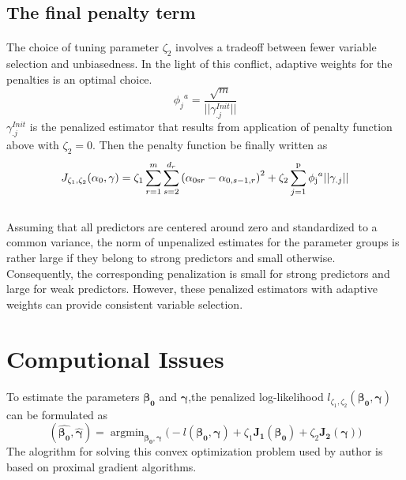 \documentclass[]{article}
\DeclareMathOperator*{\argmin}{argmin}
\begin{document}
    \subsection{The final penalty term}
    \paragraph{}
    The choice of tuning parameter $\zeta_2 $ involves a tradeoff between fewer variable selection and unbiasedness. In the light of this conflict, adaptive weights for the penalties is an optimal choice.
    \begin{equation}
    {\phi _j}^a = \frac{{\sqrt m }}{{||\gamma _{.j}^{Init}||}}
    \end{equation}
    $\gamma _{.j}^{Init}$ is the penalized estimator that results from application of penalty function above with $\zeta_2 = 0$.
    Then the penalty function be finally written as
    \begin{equation}
    {J_{{\zeta _1},{\zeta _2}}}({\alpha _0},\gamma ) = {\zeta _1}\sum\limits_{r = 1}^m {\sum\limits_{s = 2}^{{d_r}} {{{({\alpha _{0{\rm{s}}r}} - {\alpha _{0,s - 1,r}})}^2}} }  + {\zeta _2}\sum\limits_{j = 1}^{\rm{p}} {{\phi _{\rm{j}}}^a||{\gamma _{.j}}||}
    \end{equation}\\
    
    Assuming that all predictors are centered around zero and standardized to a common variance, the norm of unpenalized estimates for the parameter groups is rather large if they belong to strong predictors and small otherwise. Consequently, the corresponding penalization is small for strong predictors and large for weak predictors. However, these penalized estimators with adaptive weights can  provide consistent variable selection.
    \section{Computional Issues}%
    
    \paragraph{}To estimate the parameters $\bm{\beta_0}$ and $\bm{\gamma}$,the penalized log-likelihood $l_{\zeta_1,\zeta_2}(\bm{\beta_0},\bm{\gamma})$ can be formulated as
    \begin{equation}
    (\bm{\hat{\beta_0}},\bm{\hat{\gamma}}) = \mathop{\argmin}_{\bm{\beta_0},\bm{\gamma}}\Big(-l(\bm{\beta_0},\bm{\gamma})+\zeta_1\bm{J_1(\bm{\beta_0})} + \zeta_2\bm{J_2(\gamma)}\Big)
    \end{equation}
    The alogrithm for solving this convex optimization problem used by author is based on proximal gradient algorithms.
    
\end{document}
